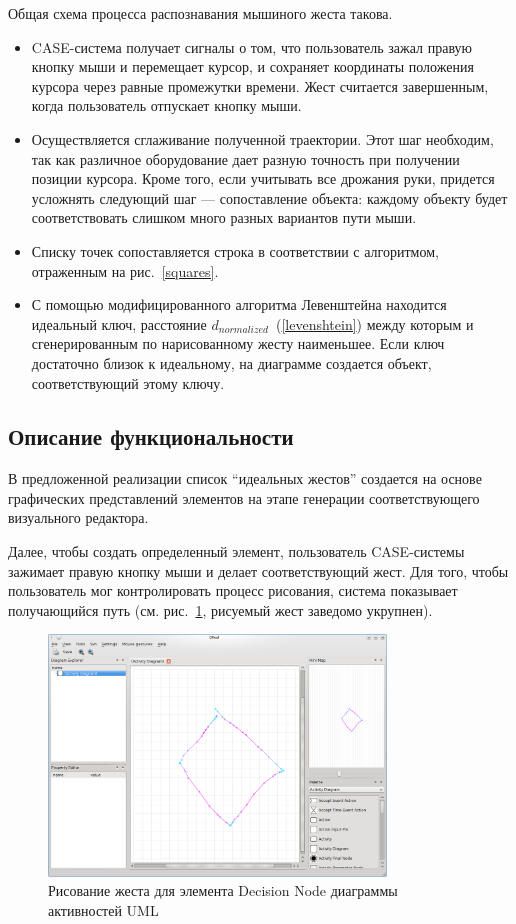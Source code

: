 \documentclass[a5paper]{article}
\begin{document}
Общая схема процесса распознавания мышиного жеста такова.

\begin{itemize}
  \item CASE-система получает сигналы о том, что пользователь зажал правую кнопку мыши и перемещает курсор, и сохраняет координаты положения курсора через равные промежутки времени. Жест считается завершенным, когда пользователь отпускает кнопку мыши.
  \item Осуществляется сглаживание полученной траектории. Этот шаг необходим, так как различное оборудование дает разную точность при получении позиции курсора. Кроме того, если учитывать все дрожания руки, придется усложнять следующий шаг --- сопоставление объекта: каждому объекту будет соответствовать слишком много разных вариантов пути мыши.
  \item Списку точек сопоставляется строка в соответствии с алгоритмом, отраженным на рис.~\ref{squares}.
  \item С помощью модифицированного алгоритма Левенштейна находится идеальный ключ, расстояние $d_{normalized}$~(\ref{levenshtein}) между которым и сгенерированным по нарисованному жесту наименьшее. Если ключ достаточно близок к идеальному, на диаграмме создается объект, соответствующий этому ключу.
\end{itemize}

\subsection{Описание функциональности}
В предложенной реализации список ``идеальных жестов'' создается на основе графических представлений элементов на этапе генерации соответствующего визуального редактора.

Далее, чтобы создать определенный элемент, пользователь CASE-системы зажимает правую кнопку мыши и делает соответствующий жест. Для того, чтобы пользователь мог контролировать процесс рисования, система показывает получающийся путь (см. рис.~\ref{drawing}, рисуемый жест заведомо укрупнен).

\begin{figure} [ht]
  \begin{center}
    \includegraphics[width=0.8\textwidth, bb=0 0 800 600]{05-drawing.png}
    \caption{Рисование жеста для элемента Decision Node диаграммы активностей UML}
    \label{drawing}
  \end{center}
\end{figure}
\end{document}
